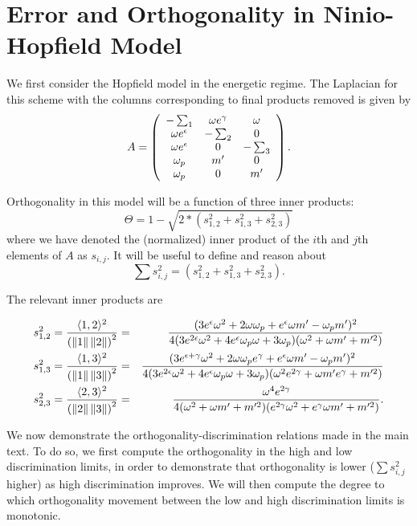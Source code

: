 \section{Error and Orthogonality in Ninio-Hopfield Model}
\label{app:hopfield}
We first consider the Hopfield model in the energetic regime.  The Laplacian for this scheme with the columns corresponding to final products removed is given by
\[ 
A = \left(\begin{array}{ccc}
-\sum_1 & \omega e^\gamma & \omega \\
\omega e^\epsilon & -\sum_2 & 0 \\
\omega e^\epsilon & 0 & -\sum_3 \\
{\omega_p} & m' & 0 \\
{\omega_p} & 0 & m' \\
\end{array}\right).
\]

Orthogonality in this model will be a function of three inner products:
\[
\Theta = 1-\sqrt{2*(s^2_{1,2} +s^2_{1,3} +s^2_{2,3} )}
\]
where we have denoted the (normalized) inner product of the $i$th and $j$th elements of $A$ as $s_{i,j}.$  It will be useful to define and reason about
\[
\sum{s^2_{i,j}}= (s^2_{1,2} +s^2_{1,3} +s^2_{2,3} ).
\]

The relevant inner products are
\begin{widetext}
\begin{eqnarray*}
s^2_{1,2} = \frac{\langle 1,2 \rangle^2}{\left(\left\lVert1\right\rVert\left\lVert2\right\rVert\right)^2}&=&\frac{(3e^\epsilon \omega^2 + 2\omega {\omega_p} + e^\epsilon \omega m' - {\omega_p} m')^2}
{4(3e^{2\epsilon}\omega^2+ 4 e^\epsilon{\omega_p} \omega + 3 {\omega_p})(\omega^2 + \omega m' + m'^2)}\\
s^2_{1,3} = \frac{\langle 1,3 \rangle^2}{\left(\left\lVert1\right\rVert\left\lVert3\right\rVert\right)^2}&=&\frac{(3e^{\epsilon+\gamma} \omega^2 + 2\omega {\omega_p} e^{\gamma} + e^\epsilon \omega m' - {\omega_p} m')^2}{4(3e^{2\epsilon}\omega^2+ 4 e^\epsilon{\omega_p} \omega + 3 {\omega_p})(\omega^2e^{2\gamma} + \omega m' e^{\gamma}+ m'^2)}\\
s^2_{2,3} = \frac{\langle 2,3\rangle^2}{\left(\left\lVert2\right\rVert\left\lVert3\right\rVert\right)^2}&=&\frac{\omega^4 e^{2\gamma}}{4(\omega^2+\omega m' + m'^2)(e^{2\gamma}\omega^2+e^\gamma \omega m' + m'^2)}.\\
\end{eqnarray*}
\end{widetext}

We now demonstrate the orthogonality-discrimination relations made in the main text.   To do so, we first compute the orthogonality in the high and low discrimination limits, in order to demonstrate that orthogonality is lower ($\sum{s^2_{i,j}}$ higher) as high discrimination improves.  We will then compute the degree to which orthogonality movement between the low and high discrimination limits is monotonic.

